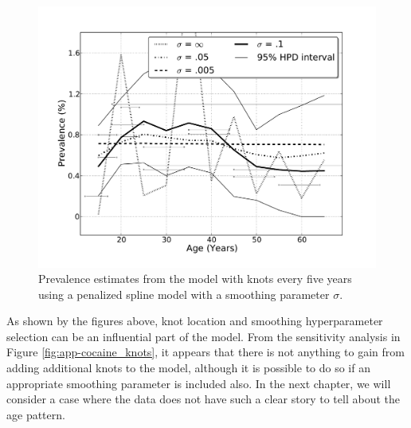     \begin{figure}[h]
        \begin{center}
            \includegraphics[width=\textwidth]{applications/cocaine_dependence-smoothing.pdf}
            \caption{Prevalence estimates from the model with knots every five years
              using a penalized spline model with a smoothing
              parameter $\sigma$. }
        \label{fig:app-cocaine_smoothing}
        \end{center}
    \end{figure}

As shown by the figures above, knot location and smoothing
hyperparameter selection can be an influential part of the model.
From the sensitivity analysis in Figure \ref{fig:app-cocaine_knots},
it appears that there is not anything to gain from adding additional
knots to the model, although it is possible to do so if an appropriate
smoothing parameter is included also.  In the next chapter, we will
consider a case where the data does not have such a clear story to
tell about the age pattern.
